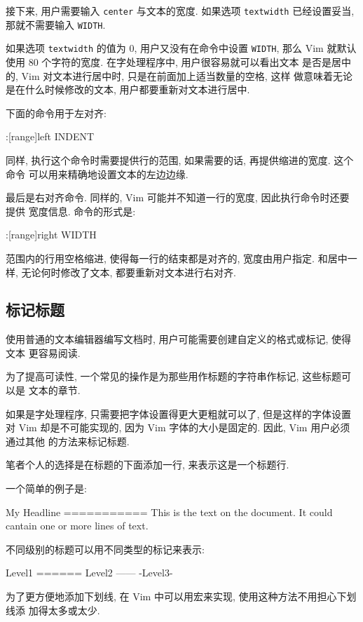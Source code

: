 接下来, 用户需要输入 \texttt{center} 与文本的宽度. 如果选项 \texttt{textwidth}
已经设置妥当, 那就不需要输入 \texttt{WIDTH}.

如果选项 \texttt{textwidth} 的值为 0, 用户又没有在命令中设置 \texttt{WIDTH},
那么 Vim 就默认使用 80 个字符的宽度. 在字处理程序中, 用户很容易就可以看出文本
是否是居中的, Vim 对文本进行居中时, 只是在前面加上适当数量的空格, 这样
做意味着无论是在什么时候修改的文本, 用户都要重新对文本进行居中.

下面的命令用于左对齐:
\begin{vimcode}
:[range]left INDENT
\end{vimcode}
同样, 执行这个命令时需要提供行的范围, 如果需要的话, 再提供缩进的宽度. 这个命令
可以用来精确地设置文本的左边边缘.

最后是右对齐命令. 同样的, Vim 可能并不知道一行的宽度, 因此执行命令时还要提供
宽度信息. 命令的形式是:
\begin{vimcode}
:[range]right WIDTH
\end{vimcode}
范围内的行用空格缩进, 使得每一行的结束都是对齐的, 宽度由用户指定. 和居中一样,
无论何时修改了文本, 都要重新对文本进行右对齐.

\subsection{标记标题}
\label{subsec:marking_headlines}

使用普通的文本编辑器编写文档时, 用户可能需要创建自定义的格式或标记, 使得文本
更容易阅读.

为了提高可读性, 一个常见的操作是为那些用作标题的字符串作标记, 这些标题可以是
文本的章节.

如果是字处理程序, 只需要把字体设置得更大更粗就可以了, 但是这样的字体设置对
Vim 却是不可能实现的, 因为 Vim 字体的大小是固定的. 因此, Vim 用户必须通过其他
的方法来标记标题.

笔者个人的选择是在标题的下面添加一行, 来表示这是一个标题行.

一个简单的例子是:
\begin{vimcode}
My Headline
===========
This is the text on the document. It could cantain one
or more lines of text.
\end{vimcode}
不同级别的标题可以用不同类型的标记来表示:
\begin{vimcode}
Level1
======
Level2
------
-Level3-
\end{vimcode}

为了更方便地添加下划线, 在 Vim 中可以用宏来实现, 使用这种方法不用担心下划线添
加得太多或太少.

